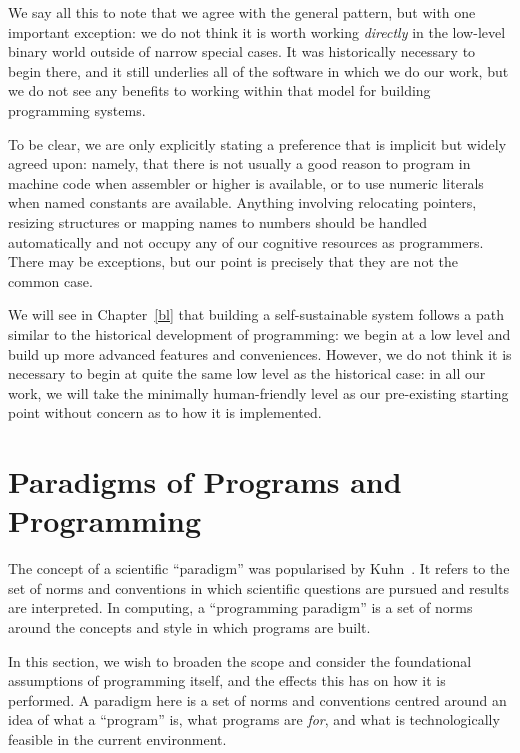 \documentclass[ twoside,openright,titlepage,numbers=noenddot,headinclude,footinclude,cleardoublepage=empty,abstract=on,
                BCOR=5mm,paper=a4,fontsize=11pt
                ]{scrreprt}
\theoremstyle{definition}
\begin{document}
We say all this to note that we agree with the general pattern, but with
one important exception: we do not think it is worth working
\emph{directly} in the low-level binary world outside of narrow special
cases. It was historically necessary to begin there, and it still
underlies all of the software in which we do our work, but we do not see
any benefits to working within that model for building programming
systems.

To be clear, we are only explicitly stating a preference that is
implicit but widely agreed upon: namely, that there is not usually a
good reason to program in machine code when assembler or higher is
available, or to use numeric literals when named constants are
available. Anything involving relocating pointers, resizing structures
or mapping names to numbers should be handled automatically and not
occupy any of our cognitive resources as programmers. There may be
exceptions, but our point is precisely that they are not the common
case.

We will see in Chapter~\ref{bl} that building a self-sustainable system
follows a path similar to the historical development of programming: we
begin at a low level and build up more advanced features and
conveniences. However, we do not think it is necessary to begin at quite
the same low level as the historical case: in all our work, we will take
the minimally human-friendly level as our pre-existing starting point
without concern as to how it is implemented.

\hypertarget{paradigms-of-programs-and-programming}{\section{Paradigms of Programs and
Programming}\label{paradigms-of-programs-and-programming}}

The concept of a scientific ``paradigm'' was popularised by
Kuhn~\parencite{Kuhn}. It refers to the set of norms and conventions in
which scientific questions are pursued and results are interpreted. In
computing, a ``programming paradigm'' is a set of norms around the
concepts and style in which programs are built.

In this section, we wish to broaden the scope and consider the
foundational assumptions of programming itself, and the effects this has
on how it is performed. A paradigm here is a set of norms and
conventions centred around an idea of what a ``program'' is, what
programs are \emph{for}, and what is technologically feasible in the
current environment.
\end{document}
